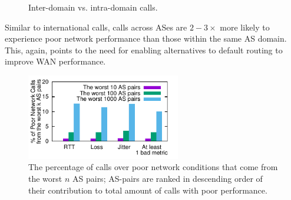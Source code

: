 \begin{figure}[t!]
\centering
\caption{Inter-domain vs. intra-domain calls.}
\label{fig:domain}
\end{figure}

Similar to international calls, calls across ASes 
are $2-3\times$ more likely to experience poor 
network performance than those within the same 
AS domain. %
This, again, points to the need for enabling alternatives to default routing to improve WAN performance.

\begin{figure}[t!]
\centering
\includegraphics[width=0.6\textwidth]{figures/Via-BadContribution-Top-AsPair.pdf}
\caption{The percentage of calls over poor network 
conditions that come from the worst $n$ AS pairs; 
AS-pairs are ranked in descending order of their 
contribution to total amount of calls with poor performance.}
\label{fig:bad-contribution}
\end{figure}


